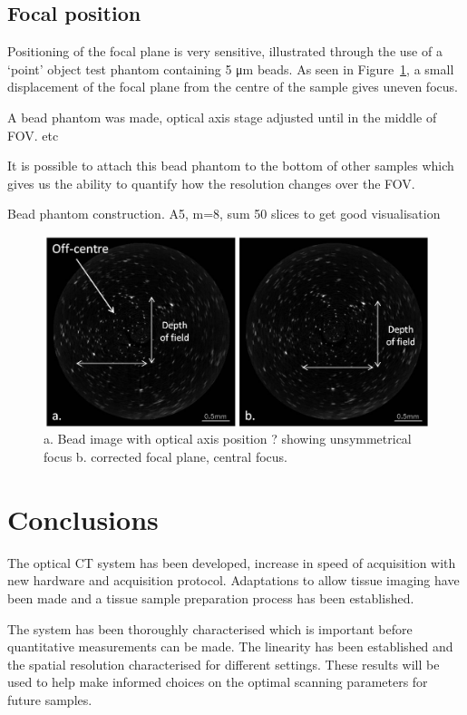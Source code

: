 \subsection{Focal position}
\label{sec:focalpos}

Positioning of the focal plane is very sensitive,  illustrated through the use of a `point' object test phantom containing 5 \si{\um} beads. As seen in Figure~\ref{fig:bead_DOF}, a small displacement of the focal plane from the centre of the sample gives uneven focus. 

A bead phantom was made, optical axis stage adjusted until in the middle of FOV.  etc

It is possible to attach this  bead phantom to the bottom of other samples which gives us the ability to quantify  how the resolution changes over the FOV. 


Bead phantom construction. A5, m=8, sum 50 slices to get good visualisation

\begin{figure}
\centering
\includegraphics[width=\linewidth]{meth_img/focusing_beads.jpg}
\caption{a. Bead image with optical axis position ? showing unsymmetrical focus b. corrected focal plane, central focus.}
\label{fig:bead_DOF}
\end{figure}



\section{Conclusions}

The optical CT system has been developed, increase in speed of acquisition with new hardware and acquisition protocol. Adaptations to allow tissue imaging have been made and a tissue sample preparation process has been established. 

The system has been thoroughly characterised which is important before quantitative measurements can be made. The linearity has been established and the spatial resolution characterised for different settings. These results will be used to help make informed choices on the optimal scanning parameters for future samples. 

















